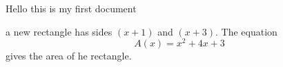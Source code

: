 \documentclass[11px]{article}
\begin{document}
Hello this is my first document

a new rectangle has sides $(x + 1)$ and $(x + 3)$.
The equation $${A(x) = x^2 + 4x + 3}$$ gives the area of he rectangle.
\end{document}
